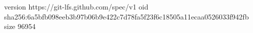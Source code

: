 version https://git-lfs.github.com/spec/v1
oid sha256:6a5bfb098eeb3b97b06b9e422c7d78fa5f23f6c18505a11ecaa0526033f942fb
size 96954
